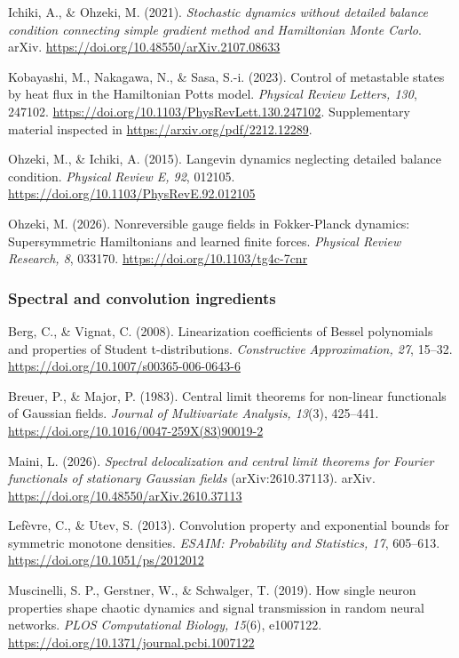 \documentclass[
  british,
  11pt,
  a4paper,
]{article}
\begin{document}
Ichiki, A., \& Ohzeki, M. (2021). \emph{Stochastic dynamics without
detailed balance condition connecting simple gradient method and
Hamiltonian Monte Carlo}. arXiv.
\url{https://doi.org/10.48550/arXiv.2107.08633}

Kobayashi, M., Nakagawa, N., \& Sasa, S.-i. (2023). Control of
metastable states by heat flux in the Hamiltonian Potts model.
\emph{Physical Review Letters, 130}, 247102.
\url{https://doi.org/10.1103/PhysRevLett.130.247102}. Supplementary
material inspected in \url{https://arxiv.org/pdf/2212.12289}.

Ohzeki, M., \& Ichiki, A. (2015). Langevin dynamics neglecting detailed
balance condition. \emph{Physical Review E, 92}, 012105.
\url{https://doi.org/10.1103/PhysRevE.92.012105}

Ohzeki, M. (2026). Nonreversible gauge fields in Fokker-Planck dynamics:
Supersymmetric Hamiltonians and learned finite forces. \emph{Physical
Review Research, 8}, 033170. \url{https://doi.org/10.1103/tg4c-7cnr}

\subsubsection{Spectral and convolution
ingredients}\label{spectral-and-convolution-ingredients}

Berg, C., \& Vignat, C. (2008). Linearization coefficients of Bessel
polynomials and properties of Student t-distributions.
\emph{Constructive Approximation, 27}, 15--32.
\url{https://doi.org/10.1007/s00365-006-0643-6}

Breuer, P., \& Major, P. (1983). Central limit theorems for non-linear
functionals of Gaussian fields. \emph{Journal of Multivariate Analysis,
13}(3), 425--441. \url{https://doi.org/10.1016/0047-259X(83)90019-2}

Maini, L. (2026). \emph{Spectral delocalization and central limit
theorems for Fourier functionals of stationary Gaussian fields}
(arXiv:2610.37113). arXiv.
\url{https://doi.org/10.48550/arXiv.2610.37113}

Lefèvre, C., \& Utev, S. (2013). Convolution property and exponential
bounds for symmetric monotone densities. \emph{ESAIM: Probability and
Statistics, 17}, 605--613. \url{https://doi.org/10.1051/ps/2012012}

Muscinelli, S. P., Gerstner, W., \& Schwalger, T. (2019). How single
neuron properties shape chaotic dynamics and signal transmission in
random neural networks. \emph{PLOS Computational Biology, 15}(6),
e1007122. \url{https://doi.org/10.1371/journal.pcbi.1007122}
\end{document}
